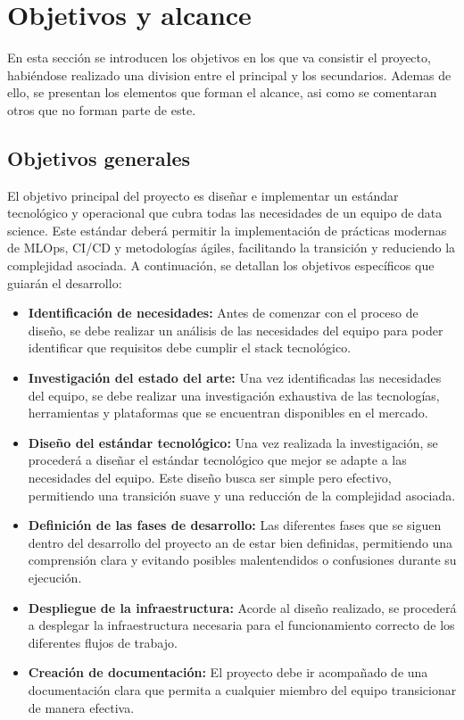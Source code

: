 \section{Objetivos y alcance}
En esta sección se introducen los objetivos en los que va consistir el
proyecto, habiéndose realizado una division entre el principal y los
secundarios. Ademas de ello, se presentan los elementos que forman el alcance,
asi como se comentaran otros que no forman parte de este.

\subsection{Objetivos generales}
El objetivo principal del proyecto es diseñar e implementar un estándar tecnológico y 
operacional que cubra todas las necesidades de un equipo de data science. Este estándar
deberá permitir la implementación de prácticas modernas de MLOps, CI/CD y metodologías
ágiles, facilitando la transición y reduciendo la complejidad asociada. A continuación,
se detallan los objetivos específicos que guiarán el desarrollo:

\begin{itemize}
    \item \textbf{Identificación de necesidades:} Antes de comenzar con el proceso de
    diseño, se debe realizar un análisis de las necesidades del equipo para poder
    identificar que requisitos debe cumplir el stack tecnológico.
    \item \textbf{Investigación del estado del arte:} Una vez identificadas las necesidades
    del equipo, se debe realizar una investigación exhaustiva de las tecnologías, herramientas
    y plataformas que se encuentran disponibles en el mercado.
    \item \textbf{Diseño del estándar tecnológico:} Una vez realizada la investigación, se procederá
    a diseñar el estándar tecnológico que mejor se adapte a las necesidades del equipo. Este diseño
    busca ser simple pero efectivo, permitiendo una transición suave y una reducción de la
    complejidad asociada.
    \item \textbf{Definición de las fases de desarrollo:} Las diferentes fases que se siguen
    dentro del desarrollo del proyecto an de estar bien definidas, permitiendo una comprensión
    clara y evitando posibles malentendidos o confusiones durante su ejecución.
    \item \textbf{Despliegue de la infraestructura:} Acorde al diseño realizado, se procederá
    a desplegar la infraestructura necesaria para el funcionamiento correcto de los diferentes
    flujos de trabajo.
    \item \textbf{Creación de documentación:} El proyecto debe ir acompañado de una documentación
    clara que permita a cualquier miembro del equipo transicionar de manera efectiva.
\end{itemize}

